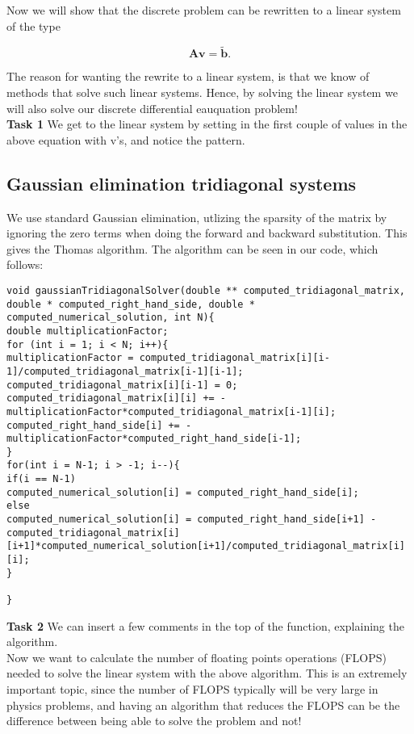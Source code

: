 \documentclass{article}
\begin{document}
Now we will show that the discrete problem can be rewritten to a linear system of the type 

\begin{equation*}
\mathbf{A}\mathbf{v} = \tilde{\mathbf{b}}.
\end{equation*}

The reason for wanting the rewrite to a linear system, is that we know of methods that solve such linear systems. Hence, by solving the linear system we will also solve our discrete differential eauquation problem!\\

\textbf{Task 1} We get to the linear system by setting in the first couple of values in the above equation with v's, and notice the pattern. 

\subsection{Gaussian elimination tridiagonal systems}
We use standard Gaussian elimination, utlizing the sparsity of the matrix by ignoring the zero terms when doing the forward and backward substitution. This gives the Thomas algorithm. The algorithm can be seen in our code, which follows:

\begin{lstlisting}
void gaussianTridiagonalSolver(double ** computed_tridiagonal_matrix, double * computed_right_hand_side, double * computed_numerical_solution, int N){
double multiplicationFactor;
for (int i = 1; i < N; i++){
multiplicationFactor = computed_tridiagonal_matrix[i][i-1]/computed_tridiagonal_matrix[i-1][i-1];
computed_tridiagonal_matrix[i][i-1] = 0;
computed_tridiagonal_matrix[i][i] += - multiplicationFactor*computed_tridiagonal_matrix[i-1][i];
computed_right_hand_side[i] += - multiplicationFactor*computed_right_hand_side[i-1];
}
for(int i = N-1; i > -1; i--){
if(i == N-1)
computed_numerical_solution[i] = computed_right_hand_side[i];
else
computed_numerical_solution[i] = computed_right_hand_side[i+1] - computed_tridiagonal_matrix[i][i+1]*computed_numerical_solution[i+1]/computed_tridiagonal_matrix[i][i];
}

}
\end{lstlisting}

\textbf{Task 2} We can insert a few comments in the top of the function, explaining the algorithm. \\

Now we want to calculate the number of floating points operations (FLOPS) needed to solve the linear system with the above algorithm. This is an extremely important topic, since the number of FLOPS typically will be very large in physics problems, and having an algorithm that reduces the FLOPS can be the difference between being able to solve the problem and not!\\
\end{document}
